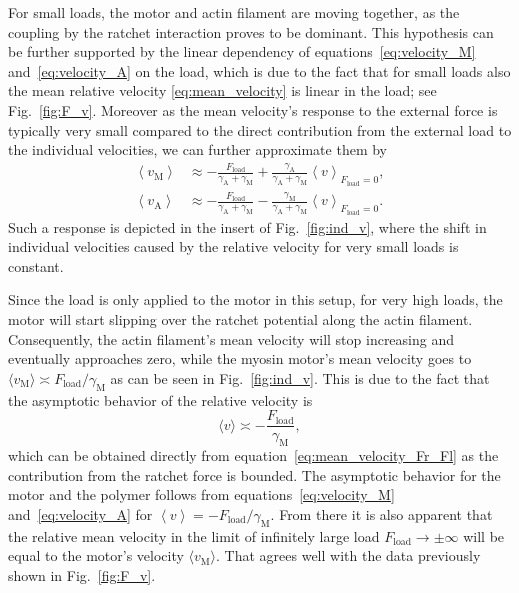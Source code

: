 \documentclass[aps,pre,twocolumn,showpacs,showkeys,superscriptaddress,floatfix]{revtex4-1}
\begin{document}
For small loads, the motor and actin filament are moving together, as the coupling by the ratchet interaction proves to be dominant. 
This hypothesis can be further supported by the linear dependency of equations~\eqref{eq:velocity_M} and~\eqref{eq:velocity_A} on the load, 
which is due to the fact that for small loads also the mean relative velocity \eqref{eq:mean_velocity} is linear in the load; see Fig.~\ref{fig:F_v}. 
Moreover as the mean velocity's response to the external force is typically very small compared to the direct contribution from the external load to the individual velocities,
we can further approximate them by  
\begin{align*}
\left\langle v_\text{M} \right\rangle 
&\approx - \frac{ F_\text{load} }{ \gamma_\text{A} + \gamma_\text{M} } + \frac{ \gamma_\text{A} }{ \gamma_\text{A} + \gamma_\text{M} } \left\langle v \right\rangle_{ F_\text{load} = 0 },
\\
\left\langle v_\text{A} \right\rangle 
&\approx - \frac{ F_\text{load} }{ \gamma_\text{A} + \gamma_\text{M} } - \frac{ \gamma_\text{M} }{ \gamma_\text{A} + \gamma_\text{M} } \left\langle v \right\rangle_{ F_\text{load} = 0 } .
\end{align*}
Such a response is depicted in the insert of Fig.~\ref{fig:ind_v}, where the shift in individual velocities caused by the relative velocity for very small loads is constant.

Since the load is only applied to the motor in this setup, for very high loads, the motor will start slipping over the ratchet potential along the actin filament. 
Consequently, the actin filament's mean velocity will stop increasing and eventually approaches zero, 
while the myosin motor's mean velocity goes to $\langle v_\text{M} \rangle \asymp F_\text{load}/\gamma_\text{M} $
as can be seen in Fig.~\ref{fig:ind_v}. 
This is due to the fact that the asymptotic behavior of the relative velocity  is
\[
\langle v \rangle \asymp - \frac{ F_\text{load} }{\gamma_\text{M} },
\]
which can be obtained directly from equation~\eqref{eq:mean_velocity_Fr_Fl} as the contribution from the ratchet force is bounded.
The asymptotic behavior for the motor and the polymer follows from equations~\eqref{eq:velocity_M} and~\eqref{eq:velocity_A} for $ \left\langle v \right\rangle = - F_\text{load} / \gamma_\text{M} $. 
From there it is also apparent that the relative mean velocity in the limit of infinitely large load $F_\text{load} \to \pm \infty$ will be equal to the motor's velocity $\langle v_\text{M} \rangle$.
That agrees well with the data previously shown in Fig.~\ref{fig:F_v}.
\end{document}
